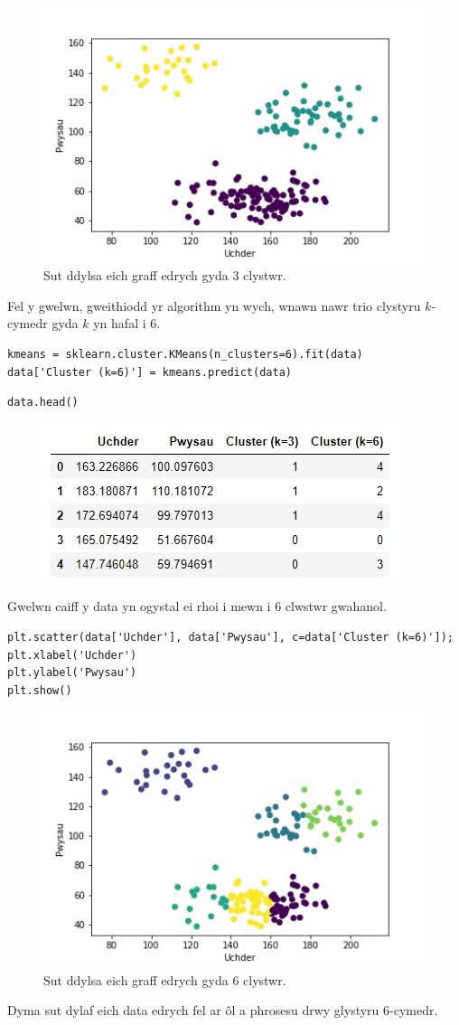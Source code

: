\begin{figure}[H]
\begin{center}
\includegraphics[width=0.7\linewidth]{../img/3clystwrpython.jpeg}
\caption{Sut ddylsa eich graff edrych gyda 3 clystwr.}
\label{fig:3clystwrpython}
\end{center}
\end{figure}

Fel y gwelwn, gweithiodd yr algorithm yn wych, wnawn nawr trio clystyru $k$-cymedr gyda $k$ yn hafal i 6.

\begin{verbatim}
kmeans = sklearn.cluster.KMeans(n_clusters=6).fit(data)
data['Cluster (k=6)'] = kmeans.predict(data)
\end{verbatim}

\begin{verbatim}
data.head()
\end{verbatim}

\begin{figure}[H]
\includegraphics[width=0.35\linewidth]{../img/tabl3.jpg}
\label{fig:Data3}
\end{figure}

Gwelwn caiff y data yn ogystal ei rhoi i mewn i 6 clwstwr gwahanol. 

\begin{verbatim}
plt.scatter(data['Uchder'], data['Pwysau'], c=data['Cluster (k=6)']);
plt.xlabel('Uchder')
plt.ylabel('Pwysau')
plt.show()
\end{verbatim}

\begin{figure}[H]
\begin{center}
\includegraphics[width=0.7\linewidth]{../img/6clystwrpython.jpeg}
\caption{Sut ddylsa eich graff edrych gyda 6 clystwr.}
\label{fig:6clystwrpython}
\end{center}
\end{figure}

Dyma sut dylaf eich data edrych fel ar \^{o}l a phrosesu drwy glystyru 6-cymedr. 
